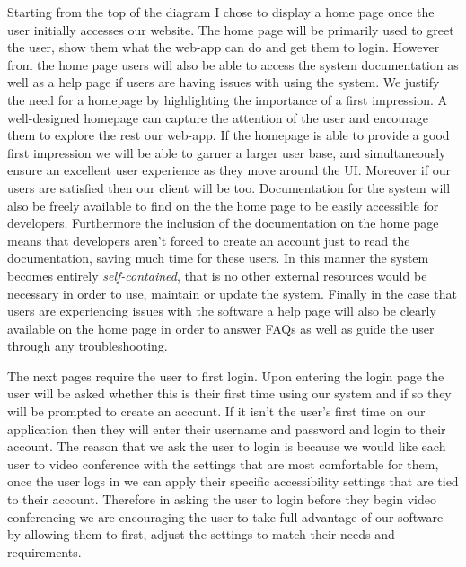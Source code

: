 Starting from the top of the diagram I chose to display a
home page once the user initially accesses our website. The 
home page will be primarily used to greet the user, show them 
what the web-app can do and get them to login. However from
the home page users will also be able to access the system 
documentation as well as a help page if users are having issues
with using the system. We justify the need for a homepage by 
highlighting the importance of a first impression. A 
well-designed homepage can capture the attention of the user
and encourage them to explore the rest our web-app. If the
homepage is able to provide a good first impression we will be
able to garner a larger user base, and simultaneously ensure an 
excellent user experience as they move around the UI. Moreover
if our users are satisfied then our client will be too. 
Documentation for the system will also be freely available to 
find on the the home page to be easily accessible for
developers. Furthermore the inclusion of the documentation 
on the home page means that developers aren't forced to create
an account just to read the documentation, saving much time for
these users. In this manner the system becomes entirely 
\textit{self-contained}, that is no other external resources 
would be necessary in order to use, maintain or update the
system. Finally in the case that users are experiencing issues
with the software a help page will also be clearly available on
the home page in order to answer FAQs as well as guide the user
through any troubleshooting. \\ \vspace{0.2cm}

The next pages require the user to first login. Upon entering 
the login page the user will be asked whether this is their 
first time using our system and if so they will be prompted to 
create an account. If it isn't the user's first time on our 
application then they will enter their username and password
and login to their account. The reason that we ask the user to 
login is because we would like each user to video conference 
with the settings that are most comfortable for them, once the
user logs in we can apply their specific accessibility 
settings that are tied to their account. Therefore in asking
the user to login before they begin video conferencing we are 
encouraging the user to take full advantage of our software by 
allowing them to first, adjust the settings to match their 
needs and requirements. \\ \vspace{0.2cm}

